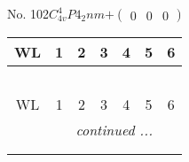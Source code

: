 \documentclass[fleqn,9pt,landscape]{jsarticle}
\begin{document}
\newpage
No. 102\quad$C_{4v}^{4}$\quad$P4_2nm$\quad[ tetragonal ]\quad$+\begin{pmatrix} 0 & 0 & 0 \end{pmatrix}$
\begin{center}
\renewcommand{\arraystretch}{1.2}
\begin{longtable}{ccccccc}
 \hline \hline
WL & 1 & 2 & 3 & 4 & 5 & 6 \\ \hline \endfirsthead

\multicolumn{6}{l}{\tablename\ \thetable{}} \\
 \hline \hline
WL & 1 & 2 & 3 & 4 & 5 & 6 \\ \hline \endhead

 \hline \hline
\multicolumn{6}{r}{\footnotesize\it continued ...} \\ \endfoot

 \hline \hline
\multicolumn{6}{r}{} \\ \endlastfoot


\end{longtable}
\end{center}
\end{document}
